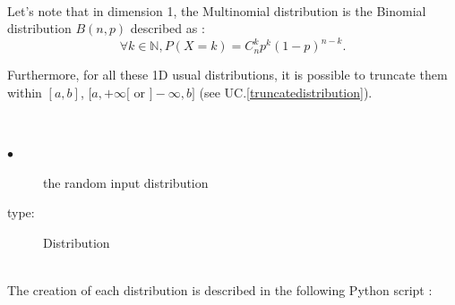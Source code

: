 \textspace\\
Let's note that in dimension 1, the Multinomial distribution is the Binomial distribution $B(n,p)$ described as :
$$
\forall k \in  \mathbb{N}, P(X=k) = C^k_n p^k (1-p)^{n-k}.
$$

Furthermore, for all these 1D usual distributions, it is possible to truncate them within $[a,b]$, $[a, +\infty[$ or $]-\infty, b]$ (see UC.\ref{truncatedistribution}).

\textspace\\
\noindent%
{
  \begin{description}
  \item[$\bullet$] the random input distribution
  \item[type:] Distribution
  \end{description}
}

\textspace\\
The creation of each distribution is described in the following Python script :

